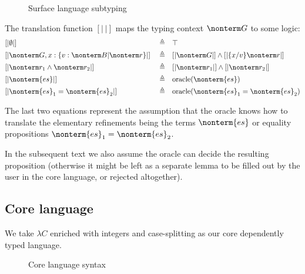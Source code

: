 \documentclass[a4paper]{article}
\begin{document}
\begin{figure}[ht]
  \footnotesize
  \caption{Surface language subtyping}
  \label{fig:surface_subtyping}
\end{figure}
The translation function $[|\ |]$ maps the typing context $\nonterm G$ to some logic:
\begin{equation}
\begin{aligned}
  & [| \emptyset |]                                         && \triangleq && \top																						  \\
  & [| \nonterm G, x : \{ v : \nonterm B | \nonterm r \} |] && \triangleq && [| \nonterm G |] \land [| \{x/v\} \nonterm r |]  \\
  & [| \nonterm r_1 \land \nonterm r_2 |]                   && \triangleq && [| \nonterm r_1 |] \land [| \nonterm r_2 |]      \\
  & [| \nonterm{es} |]                                      && \triangleq && \text{oracle}(\nonterm{es})                      \\
  & [| \nonterm{es}_1 = \nonterm{es}_2 |]                   && \triangleq && \text{oracle}(\nonterm{es}_1 = \nonterm{es}_2)   \\
\end{aligned}
\end{equation}

The last two equations represent the assumption
that the oracle knows how to translate the elementary refinements being the terms $\nonterm{es}$
or equality propositions $\nonterm{es}_1 = \nonterm{es}_2$.


In the subsequent text we also assume the oracle can decide the resulting proposition
(otherwise it might be left as a separate lemma to be filled out by the user in the core language, or rejected altogether).

\subsection{Core language}

We take $\lambda C$ \cite{Nederpelt14} enriched with integers and case-splitting as our core dependently typed language.

\begin{figure}[ht]
  \footnotesize
  \caption{Core language syntax}
  \label{fig:core_syntax}
\end{figure}
\end{document}
